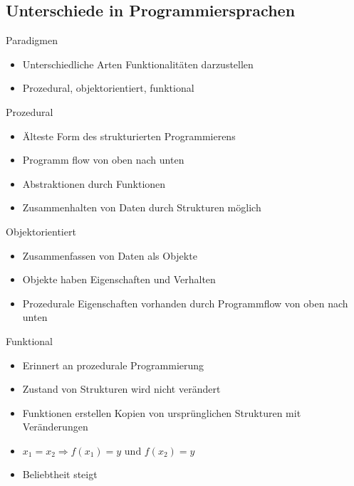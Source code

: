 \subsection{Unterschiede in Programmiersprachen}

\begin{frame}{Paradigmen}
    \begin{itemize}
        \item Unterschiedliche Arten Funktionalitäten darzustellen
        \item Prozedural, objektorientiert, funktional
    \end{itemize}
\end{frame}



\begin{frame}{Prozedural}
    \begin{itemize}
        \item Älteste Form des strukturierten Programmierens
        \item Programm flow von oben nach unten
        \item Abstraktionen durch Funktionen
        \item Zusammenhalten von Daten durch Strukturen möglich
    \end{itemize}
\end{frame}

\begin{frame}{Objektorientiert}
    \begin{itemize}
        \item Zusammenfassen von Daten als Objekte
        \item Objekte haben Eigenschaften und Verhalten
        \item Prozedurale Eigenschaften vorhanden durch Programmflow von oben nach unten
    \end{itemize}
\end{frame}

\begin{frame}{Funktional}
    \begin{itemize}
        \item Erinnert an prozedurale Programmierung
        \item Zustand von Strukturen wird nicht verändert
        \item Funktionen erstellen Kopien von ursprünglichen Strukturen mit Veränderungen
        \item $x_1 = x_2 \Rightarrow f(x_1) = y \text{ und } f(x_2) = y$
        \item Beliebtheit steigt
    \end{itemize}
\end{frame}

